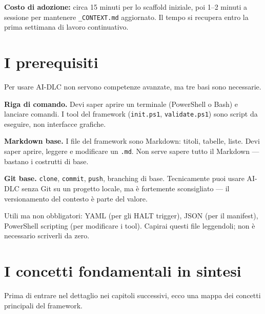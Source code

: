 \begin{tipbox}
\textbf{Costo di adozione:} circa 15 minuti per lo scaffold iniziale, poi 1--2 minuti a sessione per mantenere \texttt{\_CONTEXT.md} aggiornato. Il tempo si recupera entro la prima settimana di lavoro continuativo.
\end{tipbox}

\section{I prerequisiti}
\label{sec:01-prerequisiti}

Per usare AI-DLC non servono competenze avanzate, ma tre basi sono necessarie.

\textbf{Riga di comando.} Devi saper aprire un terminale (PowerShell o Bash) e lanciare comandi. I tool del framework (\texttt{init.ps1}, \texttt{validate.ps1}) sono script da eseguire, non interfacce grafiche.

\textbf{Markdown base.} I file del framework sono Markdown: titoli, tabelle, liste. Devi saper aprire, leggere e modificare un \texttt{.md}. Non serve sapere tutto il Markdown --- bastano i costrutti di base.

\textbf{Git base.} \texttt{clone}, \texttt{commit}, \texttt{push}, branching di base. Tecnicamente puoi usare AI-DLC senza Git su un progetto locale, ma è fortemente sconsigliato --- il versionamento del contesto è parte del valore.

Utili ma non obbligatori: YAML (per gli HALT trigger), JSON (per il manifest), PowerShell scripting (per modificare i tool). Capirai questi file leggendoli; non è necessario scriverli da zero.

\section{I concetti fondamentali in sintesi}
\label{sec:01-concetti}

Prima di entrare nel dettaglio nei capitoli successivi, ecco una mappa dei concetti principali del framework.

